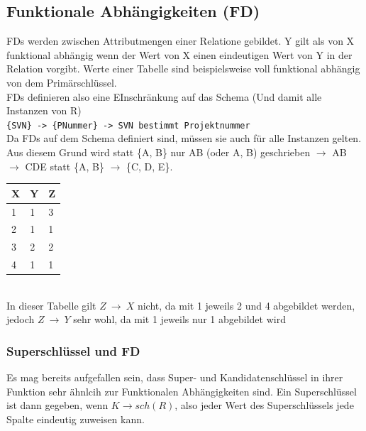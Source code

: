 \documentclass{article}
\begin{document}
	\subsection{Funktionale Abhängigkeiten (FD)}
	FDs werden zwischen Attributmengen einer Relatione gebildet. Y gilt als von X funktional abhängig wenn der Wert von X einen eindeutigen Wert von Y in der Relation vorgibt. Werte einer Tabelle sind beispielsweise voll funktional abhängig von dem Primärschlüssel. \\
	FDs definieren also eine EInschränkung auf das Schema (Und damit alle Instanzen von R) \\
	\verb|{SVN} -> {PNummer} -> SVN bestimmt Projektnummer| \\
	Da FDs auf dem Schema definiert sind, müssen sie auch für alle Instanzen gelten. Aus diesem Grund wird statt \{A, B\} nur AB (oder A, B) geschrieben $\to$ AB $\to$ CDE statt \{A, B\} $\to$ \{C, D, E\}. \\
	\begin{tabular}{| l | l | l |}
		\toprule
		X & Y & Z \\ \midrule
		1 & 1 & 3 \\
		2 & 1 & 1 \\
		3 & 2 & 2 \\
		4 & 1 & 1 \\
		\bottomrule
	\end{tabular} \\
	In dieser Tabelle gilt $Z\ \to\ X$ nicht, da mit 1 jeweils 2 und 4 abgebildet werden, jedoch $Z\ \to\ Y$ sehr wohl, da mit 1 jeweils nur 1 abgebildet wird
	\subsubsection{Superschlüssel und FD}
	Es mag bereits aufgefallen sein, dass Super- und Kandidatenschlüssel in ihrer Funktion sehr ähnlcih zur Funktionalen Abhängigkeiten sind. Ein Superschlüssel ist dann gegeben, wenn $K\to sch(R)$, also jeder Wert des Superschlüssels jede Spalte eindeutig zuweisen kann.
\end{document}
